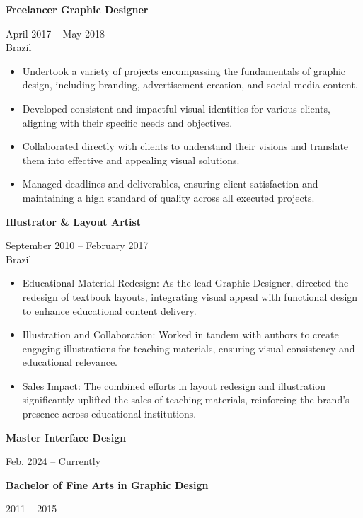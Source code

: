 \documentclass[10pt,a4paper,ragged2e,withhyper]{altacv}
\renewcommand{\cvevent}[4]{%
  \textbf{#1} %
  \hfill %
  \begin{minipage}[t]{.5\linewidth}
    \raggedleft %
    \small#3 %
    \\ %
    #4 %
  \end{minipage}
  \vspace{\baselineskip} %
}
\begin{document}
\divider

\cvevent{Freelancer Graphic Designer}{}{April 2017 -- May 2018}{Brazil}
\begin{itemize}
  \item Undertook a variety of projects encompassing the fundamentals of graphic design, including branding, advertisement creation, and social media content.
  \item Developed consistent and impactful visual identities for various clients, aligning with their specific needs and objectives.
  \item Collaborated directly with clients to understand their visions and translate them into effective and appealing visual solutions.
  \item Managed deadlines and deliverables, ensuring client satisfaction and maintaining a high standard of quality across all executed projects.
\end{itemize}

\divider

\cvevent{Illustrator \& Layout Artist}{Editora Teth}{September 2010 -- February 2017}{Brazil}
\begin{itemize}
  \item Educational Material Redesign: As the lead Graphic Designer, directed the redesign of textbook layouts, integrating visual appeal with functional design to enhance educational content delivery.
  \item Illustration and Collaboration: Worked in tandem with authors to create engaging illustrations for teaching materials, ensuring visual consistency and educational relevance.
  \item Sales Impact: The combined efforts in layout redesign and illustration significantly uplifted the sales of teaching materials, reinforcing the brand's presence across educational institutions.
\end{itemize}

\vspace{0.5cm}


\cvevent{Master Interface Design}{Aela}{Feb. 2024 -- Currently}{}

\divider

\cvevent{Bachelor of Fine Arts in Graphic Design}{Universidade Estácio de Sá}{2011 -- 2015}{}
\end{document}
